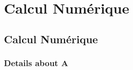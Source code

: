 \documentclass[12pt]{article}
\begin{document}
\section{Calcul Numérique}

\subsection{Calcul Numérique}

\subsubsection{Details about A}
\end{document}
